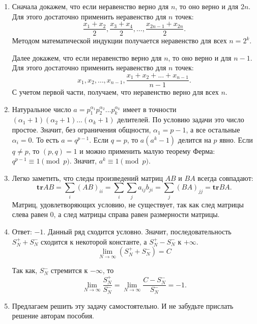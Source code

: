 \documentclass[11pt, a4paper]{article}
\begin{document}
\begin{enumerate}
\item Сначала докажем, что если неравенство верно для $n$, то оно верно и для $2n$. Для этого достаточно применить неравенство для $n$ точек:
$$\frac{x_1 + x_2}{2}, \frac{x_3 + x_4}{2}, \ldots, \frac{x_{2n-1} + x_{2n}}{2}.$$
Методом математической индукции получается неравенство для всех $n = 2^k$.

Далее докажем, что если неравенство верно для $n$, то оно верно и для $n-1$. Для этого достаточно применить неравенство для $n$ точек:
$$x_1, x_2, \ldots, x_{n-1}, \frac{x_1 + x_2 + ... + x_{n-1}}{n-1}.$$
С учетом первой части, получаем, что неравенство верно для всех $n$.

\item Натуральное число $a = p_1^{\alpha_1} p_2^{\alpha_2} ... p_k^{\alpha_k}$ имеет в точности $(\alpha_1 + 1) (\alpha_2 + 1) ... (\alpha_k + 1)$ делителей. По условию задачи это число простое. Значит,  без ограничения общности, $\alpha_1 = p - 1$, а все остальные $\alpha_i = 0$. То есть $a = q ^ {p-1}$. Если $q = p$, то $a (a^k - 1)$ делится на $p$ явно. Если $q \neq p$, то $(p, q) = 1$ и можно применить малую теорему Ферма: $q^{p-1} \equiv 1 \pmod p$. Значит, $a^k \equiv 1 \pmod p$.

\item Легко заметить, что следы произведений матриц $AB$ и $BA$ всегда совпадают:
$$\mathbf{tr} AB = \sum_i (AB)_{ii} = \sum_i \sum_j a_{ij} b_{ji} =  \sum_j (BA)_{jj} = \mathbf{tr} BA.$$
Матриц, удовлетворяющих условию, не существует, так как след матрицы слева равен 0, а след матрицы справа равен размерности матрицы.

\item Ответ: $-1$. Данный ряд сходится условно. Значит, последовательность $S_N^{+}+S_N^{-}$ сходится к некоторой константе, а $S_N^{+}-S_N^{-}$ к $+\infty$. $$\lim\limits_{N \rightarrow \infty}(S_N^{+}+S_N^{-}) = C$$

Так как, $S_N^{-}$ стремится к $-\infty$, то 
$$\lim\limits_{N \rightarrow \infty} \frac{S_N^{+}}{S_N^{-}} = \lim\limits_{N \rightarrow \infty} \frac{C - S_N^{-}}{S_N^{-}} = -1.$$

\item Предлагаем решить эту задачу самостоятельно. И не забудьте прислать решение авторам пособия.

\end{enumerate}
\end{document}
